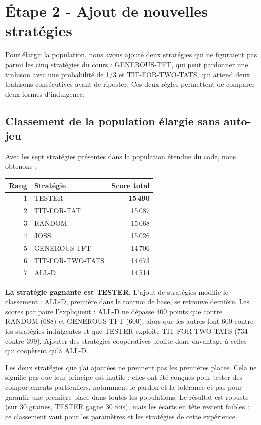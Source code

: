 \documentclass[10pt,a4paper]{article}
\begin{document}
\section{Étape 2 - Ajout de nouvelles stratégies}
Pour élargir la population, nous avons ajouté deux stratégies qui ne figuraient pas parmi les cinq stratégies du cours :
GENEROUS-TFT, qui peut pardonner une trahison avec une probabilité de 1/3 et TIT-FOR-TWO-TATS, qui attend deux trahisons
consécutives avant de riposter. Ces deux règles permettent de comparer deux formes d'indulgence.

\subsection{Classement de la population élargie sans auto-jeu}
Avec les sept stratégies présentes dans la population étendue du code, nous obtenons :
\begin{center}
\small
\begin{tabular}{@{}rlr@{}}
\toprule
Rang & Stratégie & Score total \\
\midrule
1 & TESTER & \textbf{15\,490} \\
2 & TIT-FOR-TAT & 15\,087 \\
3 & RANDOM & 15\,068 \\
4 & JOSS & 15\,026 \\
5 & GENEROUS-TFT & 14\,706 \\
6 & TIT-FOR-TWO-TATS & 14\,673 \\
7 & ALL-D & 14\,514 \\
\bottomrule
\end{tabular}
\end{center}

\textbf{La stratégie gagnante est TESTER.} L'ajout de stratégies modifie le classement : ALL-D, première dans le tournoi de
base, se retrouve dernière. Les scores par paire l'expliquent : ALL-D ne dépasse 400 points que contre RANDOM (688) et
GENEROUS-TFT (600), alors que les autres font 600 contre les stratégies indulgentes et que TESTER exploite TIT-FOR-TWO-TATS
(734 contre 399). Ajouter des stratégies coopératives profite donc davantage à celles qui coopèrent qu'à ALL-D.

Les deux stratégies que j'ai ajoutées ne prennent pas les premières places. Cela ne signifie pas que leur principe est inutile :
elles ont été conçues pour tester des comportements particuliers, notamment le pardon et la tolérance et pas pour garantir une
première place dans toutes les populations. Le résultat est robuste (sur 30 graines, TESTER gagne 30 fois), mais les écarts en
tête restent faibles : ce classement vaut pour les paramètres et les stratégies de cette expérience.
\end{document}
